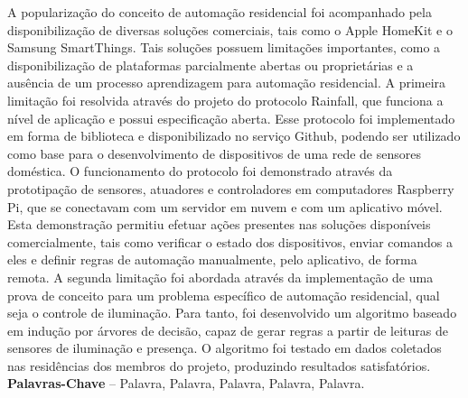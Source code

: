 \documentclass[]{politex}
\begin{document}
\begin{resumo}
A popularização do conceito de automação residencial foi acompanhado pela disponibilização de diversas soluções comerciais, tais como o Apple HomeKit e o Samsung SmartThings. Tais soluções possuem limitações importantes, como a disponibilização de plataformas parcialmente abertas ou proprietárias e a ausência de um processo aprendizagem para automação residencial. A primeira limitação foi resolvida através do projeto do protocolo Rainfall, que funciona a nível de aplicação e possui especificação aberta. Esse protocolo foi implementado em forma de biblioteca e disponibilizado no serviço Github, podendo ser utilizado como base para o desenvolvimento de dispositivos de uma rede de sensores doméstica. O funcionamento do protocolo foi demonstrado através da prototipação de sensores, atuadores e controladores em computadores Raspberry Pi, que se conectavam com um servidor em nuvem e com um aplicativo móvel. Esta demonstração permitiu efetuar ações presentes nas soluções disponíveis comercialmente, tais como verificar o estado dos dispositivos, enviar comandos a eles e definir regras de automação manualmente, pelo aplicativo, de forma remota. A segunda limitação foi abordada através da implementação de uma prova de conceito para um problema específico de automação residencial, qual seja o controle de iluminação. Para tanto, foi desenvolvido um algoritmo baseado em indução por árvores de decisão, capaz de gerar regras a partir de leituras de sensores de iluminação e presença. O algoritmo foi testado em dados coletados nas residências dos membros do projeto, produzindo resultados satisfatórios.
%
\\[3\baselineskip]
%
\textbf{Palavras-Chave} -- Palavra, Palavra, Palavra, Palavra, Palavra.
\end{resumo}




\listadefiguras
\listadetabelas
\end{document}

